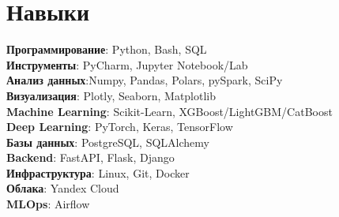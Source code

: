 \section{Навыки}
 \begin{itemize}[leftmargin=0.15in, label={}]
    {\item{
     \textbf{Программирование}{: Python, Bash, SQL} \\
     \textbf{Инструменты}{: PyCharm, Jupyter Notebook/Lab} \\
     \textbf{Анализ данных}{:Numpy, Pandas, Polars, pySpark, SciPy} \\
     \textbf{Визуализация}{: Plotly, Seaborn, Matplotlib} \\
     \textbf{Machine Learning}{: Scikit-Learn, XGBoost/LightGBM/CatBoost} \\
     \textbf{Deep Learning}{: PyTorch, Keras, TensorFlow} \\
     \textbf{Базы данных}{: PostgreSQL, SQLAlchemy} \\
     \textbf{Backend}{: FastAPI, Flask, Django} \\
     \textbf{Инфраструктура}{: Linux, Git, Docker} \\
     \textbf{Облака}{: Yandex Cloud} \\
     \textbf{MLOps}{: Airflow} \\
    }}
 \end{itemize}